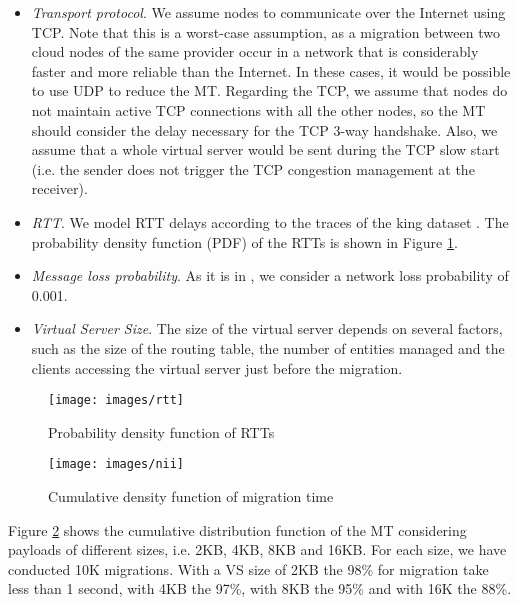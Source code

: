 \documentclass[final,10pt,a5paper]{phdimt}
\theoremstyle{definition}
\begin{document}
\begin{itemize}
\item \textit{Transport protocol}. We assume nodes to communicate over the Internet using TCP.
Note that this is a worst-case assumption, as a migration between two cloud nodes of the same provider occur in a network that is considerably faster and more reliable than the Internet. In these cases, it would be possible to use UDP to reduce the MT.
Regarding the TCP, we assume that nodes do not maintain active TCP connections with all the other nodes, so the MT should consider the delay necessary for the TCP 3-way handshake. 
Also, we assume that a whole virtual server would be sent during the TCP slow start (i.e. the sender does not trigger the TCP congestion management at the receiver).


\item \textit{RTT}. We model RTT delays according to the traces of the king dataset \cite{gummadi2002king}. 
The probability density function (PDF) of the RTTs is shown in Figure \ref{fig:rtt}.

\item \textit{Message loss probability}. 
As it is in \cite{cardwell2000modeling}, we consider a network loss probability of 0.001.

\item \textit{Virtual Server Size}. The size of the virtual server depends on several factors, such as the size of the routing table, the number of entities managed and the clients accessing the virtual server just before the migration. 

\end{itemize}


\begin{figure}[tbh]
\centering
\texttt{[image: images/rtt]}
\caption{Probability density function of RTTs}\label{fig:rtt}
\end{figure}

\begin{figure}[tbh]
\centering        
\texttt{[image: images/nii]}
\caption{Cumulative density function of migration time}\label{fig:nii}
\end{figure}


Figure \ref{fig:nii} shows the cumulative distribution function of the MT considering payloads of different sizes, i.e. 2KB, 4KB, 8KB and 16KB.
For each size, we have conducted 10K migrations.
With a VS size of 2KB the 98\% for migration take less than 1 second, with 4KB the 97\%, with 8KB the 95\% and with 16K the 88\%.
\end{document}

